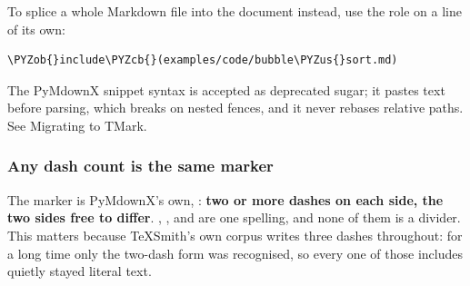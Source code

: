 \documentclass[a4paper,twoside]{article}
\begin{document}
To splice a whole Markdown file into the document instead, use the 
role on a line of its own:
\begin{tscode}[lang=md, engine=pygments]
\begin{Verbatim}[commandchars=\\\{\},breaklines, breakanywhere, commandchars=\\\{\}]
\PYZob{}include\PYZcb{}(examples/code/bubble\PYZus{}sort.md)
\end{Verbatim}
\end{tscode}
The PyMdownX snippet syntax  is accepted as deprecated sugar; it
pastes text before parsing, which breaks on nested fences, and it never rebases
relative paths. See Migrating to TMark.
\subsubsection{Any dash count is the same marker}
The marker is PyMdownX's own, : \textbf{two or more dashes on each
side, the two sides free to differ}. , ,  and
 are one spelling, and none of them is a divider. This matters
because TeXSmith's own corpus writes three dashes throughout: for a long time
only the two-dash form was recognised, so every one of those includes quietly
stayed literal text.
\end{document}
